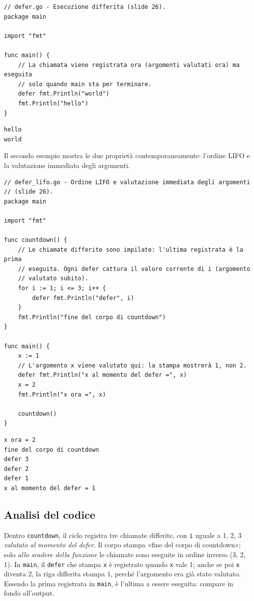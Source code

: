 \documentclass[11pt,a4paper]{report}
\newcommand{\cod}[1]{\texttt{#1}}
\begin{document}
\begin{lstlisting}[style=gocode,caption={\texttt{03\_control\_flow/defer.go}}]
// defer.go - Esecuzione differita (slide 26).
package main

import "fmt"

func main() {
	// La chiamata viene registrata ora (argomenti valutati ora) ma eseguita
	// solo quando main sta per terminare.
	defer fmt.Println("world")
	fmt.Println("hello")
}
\end{lstlisting}
\begin{lstlisting}[style=output]
hello
world
\end{lstlisting}

Il secondo esempio mostra le due proprietà contemporaneamente: l'ordine LIFO e la
valutazione immediata degli argomenti.

\begin{lstlisting}[style=gocode,caption={\texttt{03\_control\_flow/defer\_lifo.go}}]
// defer_lifo.go - Ordine LIFO e valutazione immediata degli argomenti
// (slide 26).
package main

import "fmt"

func countdown() {
	// Le chiamate differite sono impilate: l'ultima registrata è la prima
	// eseguita. Ogni defer cattura il valore corrente di i (argomento
	// valutato subito).
	for i := 1; i <= 3; i++ {
		defer fmt.Println("defer", i)
	}
	fmt.Println("fine del corpo di countdown")
}

func main() {
	x := 1
	// L'argomento x viene valutato qui: la stampa mostrerà 1, non 2.
	defer fmt.Println("x al momento del defer =", x)
	x = 2
	fmt.Println("x ora =", x)

	countdown()
}
\end{lstlisting}
\begin{lstlisting}[style=output]
x ora = 2
fine del corpo di countdown
defer 3
defer 2
defer 1
x al momento del defer = 1
\end{lstlisting}

\subsection{Analisi del codice}

Dentro \cod{countdown}, il ciclo registra tre chiamate differite, con
\cod{i} uguale a 1, 2, 3 \emph{valutato al momento del defer}. Il corpo stampa
«fine del corpo di countdown»; solo \emph{allo scadere della funzione} le
chiamate sono eseguite in ordine inverso (3, 2, 1). In \cod{main}, il
\cod{defer} che stampa \cod{x} è registrato quando \cod{x} vale 1; anche se poi
\cod{x} diventa 2, la riga differita stampa 1, perché l'argomento era già stato
valutato. Essendo la prima registrata in \cod{main}, è l'ultima a essere
eseguita: compare in fondo all'output.
\end{document}
